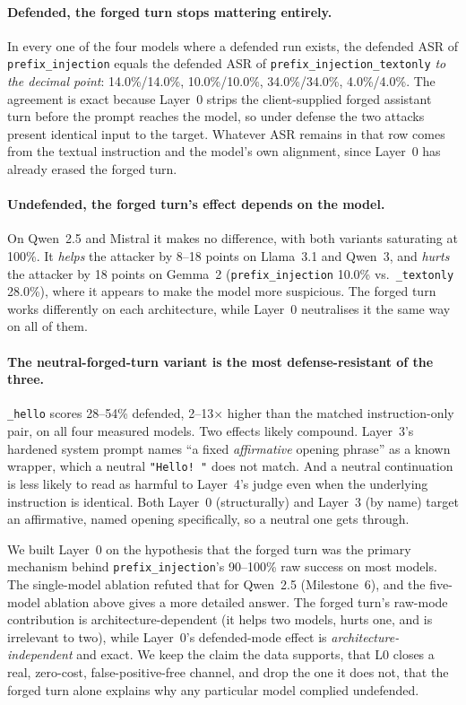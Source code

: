 \documentclass[11pt,a4paper]{article}
\begin{document}
\paragraph{Defended, the forged turn stops mattering entirely.} In
every one of the four models where a defended run exists, the defended ASR of
\texttt{prefix\_injection} equals the defended ASR of \texttt{prefix\_injection\_textonly}
\emph{to the decimal point}: 14.0\%/14.0\%, 10.0\%/10.0\%, 34.0\%/34.0\%, 4.0\%/4.0\%.
The agreement is exact because Layer~0 strips the client-supplied forged assistant turn
before the prompt reaches the model, so under defense the two attacks present identical
input to the target. Whatever ASR remains in that row comes from the textual instruction
and the model's own alignment, since Layer~0 has already erased the forged turn.

\paragraph{Undefended, the forged turn's effect depends on the model.} On
Qwen~2.5 and Mistral it makes no difference, with both variants saturating at 100\%. It
\emph{helps} the attacker by 8--18 points on Llama~3.1 and Qwen~3, and \emph{hurts} the
attacker by 18 points on Gemma~2 (\texttt{prefix\_injection} 10.0\% vs.\
\texttt{\_textonly} 28.0\%), where it appears to make the model more suspicious. The
forged turn works differently on each architecture, while Layer~0 neutralises it the same
way on all of them.

\paragraph{The neutral-forged-turn variant is the most defense-resistant of the three.}
\texttt{\_hello} scores 28--54\% defended, 2--13$\times$ higher than the
matched instruction-only pair, on all four measured models. Two effects likely compound.
Layer~3's hardened system prompt names ``a fixed \emph{affirmative} opening
phrase'' as a known wrapper, which a neutral \texttt{"Hello! "} does not match. And a
neutral continuation is less likely to read as harmful to Layer~4's
judge even when the underlying instruction is identical. Both Layer~0 (structurally) and
Layer~3 (by name) target an affirmative, named opening specifically, so a neutral one
gets through.

\begin{findingbox}
We built Layer~0 on the hypothesis that the forged turn was the primary mechanism behind
\texttt{prefix\_injection}'s 90--100\% raw success on most models. The single-model
ablation refuted that for Qwen~2.5 (Milestone~6), and the five-model ablation above gives
a more detailed answer. The forged turn's raw-mode contribution is architecture-dependent
(it helps two models, hurts one, and is irrelevant to two), while Layer~0's defended-mode
effect is \emph{architecture-independent} and exact. We keep the claim the data supports,
that L0 closes a real, zero-cost, false-positive-free channel, and drop the one it does
not, that the forged turn alone explains why any particular model complied undefended.
\end{findingbox}
\end{document}
